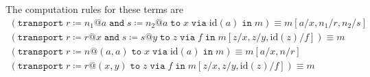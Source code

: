 \documentclass{amsart}
\makeatletter
\def\id{\mathrm{id}}
\newcommand{\Jaa}[9]{\mathtt{transport}\; #1\coloneqq #2@#3 \;\mathtt{and}\; #4\coloneqq #5@#6
  \;\mathtt{to}\; #7 \;\mathtt{via}\; #8 \;\mathtt{in}\; #9}
\newcommand{\Jab}[7]{\mathtt{transport}\; #1\coloneqq #2@(#3,#4) \;\mathtt{to}\; #5 \;\mathtt{via}\; #6 \;\mathtt{in}\; #7}
\makeatother
\begin{document}
The computation rules for these terms are
\begin{gather*}
  (\Jaa{r}{n_1}{a}{s}{n_2}{a}{x}{\id(a)}{m}) \equiv m[a/x,n_1/r,n_2/s] \\
  (\Jaa{r}{r}{x}{s}{s}{y}{z}{f}{m[z/x,z/y,\id(z)/f]}) \equiv m \\
  (\Jab{r}{n}{a}{a}{x}{\id(a)}{m}) \equiv m[a/x,n/r] \\
  (\Jab{r}{r}{x}{y}{z}{f}{m[z/x,z/y,\id(z)/f]}) \equiv m
\end{gather*}
\end{document}
